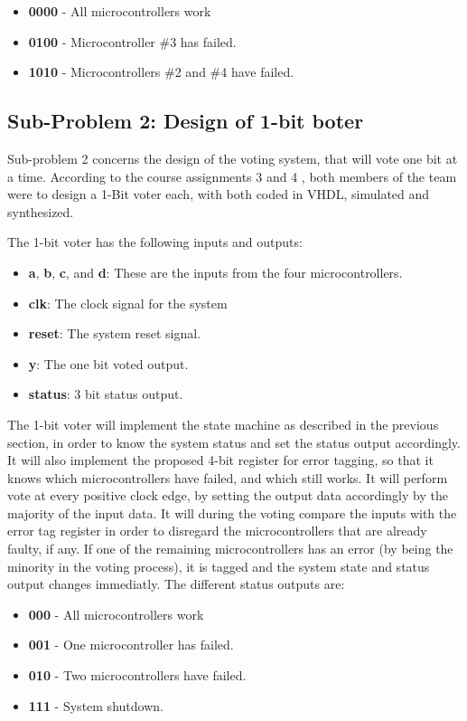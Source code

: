 \documentclass[a4paper]{IEEEtran}
\begin{document}
\begin{itemize}
    \item \textbf{0000} - All microcontrollers work
    \item \textbf{0100} - Microcontroller \#3 has failed.
    \item \textbf{1010} - Microcontrollers \#2 and \#4 have failed.
\end{itemize}

\subsection{Sub-Problem 2: Design of 1-bit boter}
Sub-problem 2 concerns the design of the voting system, that will vote one bit at a time.
According to the course assignments 3 and 4\protect\cite{assignment-3} \protect\cite{assignment-4}, both members of the team were to design a 1-Bit voter each, with both coded in VHDL, simulated and synthesized. 

The 1-bit voter has the following inputs and outputs:
\begin{itemize}
    \item \textbf{a}, \textbf{b}, \textbf{c}, and \textbf{d}: These are the inputs from the four microcontrollers.
    \item \textbf{clk}: The clock signal for the system
    \item \textbf{reset}: The system reset signal.
    \item \textbf{y}: The one bit voted output.
    \item \textbf{status}: 3 bit status output.
\end{itemize}

The 1-bit voter will implement the state machine as described in the previous section, in order to know the system status and set the status output accordingly.
It will also implement the proposed 4-bit register for error tagging, so that it knows which microcontrollers have failed, and which still works.
It will perform vote at every positive clock edge, by setting the output data accordingly by the majority of the input data.
It will during the voting compare the inputs with the error tag register in order to disregard the  microcontrollers that are already faulty, if any.
If one of the remaining microcontrollers has an error (by being the minority in the voting process), it is tagged and the system state and status output changes immediatly.
The different status outputs are:

\begin{itemize}
    \item \textbf{000} - All microcontrollers work
    \item \textbf{001} - One microcontroller has failed.
    \item \textbf{010} - Two microcontrollers have failed.
    \item \textbf{111} - System shutdown.
\end{itemize}
\end{document}
